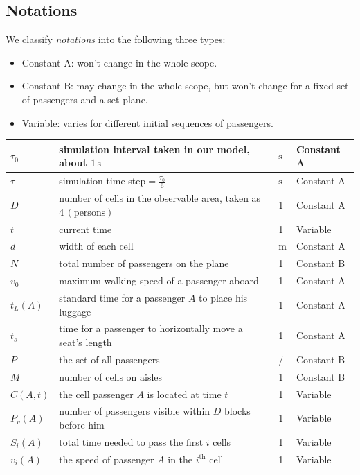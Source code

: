 \documentclass{article}
\newcommand{\cA}{\color{allanblue}Constant A\color{black}}
\newcommand{\cB}{\color{allandarkblue}Constant B\color{black}}
\newcommand{\varr}{\color{allanpurple}Variable\color{black}}
\theoremstyle{definition}
\theoremstyle{remark}
\numberwithin{equation}{section}
\begin{document}
	\subsection{Notations}
	We classify \textit{notations} into the following three types:
	\begin{itemize}
		\item \cA: won't change in the whole scope.
		\item \cB: may change in the whole scope, but won't change for a fixed set of passengers and a set plane.
		\item \varr: varies for different initial sequences of passengers.
	\end{itemize}
	\begin{center}
	\begin{tabular}{|l|l|l|l|}
		\hline
		$\tau_0$&simulation interval taken in our model, about \(1 \,\mathrm{s}\)&$\mathrm{s}$&\cA\\
		\hline
		\(\tau\)&simulation time step\(=\frac{\tau_0}{6}\)&\(\mathrm{s}\)&\cA\\
		\hline
		\(D\)&number of cells in the observable area, taken as \(4\,\left(\mathrm{persons}\right)\)&1&\cA\\
		\hline
		\(t\)&current time&1&\varr\\
		\hline
		$d$&width of each cell&$\mathrm{m}$&\cA\\
		\hline
		$N$&total number of passengers on the plane&1&\cB\\
		\hline
		$v_0$&maximum walking speed of a passenger aboard&1&\cA\\
		\hline
		$t_L (A)$&standard time for a passenger $A$ to place his luggage&1&\cA\\
		\hline
		$t_s$&time for a passenger to horizontally move a seat's length&1&\cA\\
		\hline
		$P$&the set of all passengers&/&\cB\\
		\hline
		$M$&number of cells on aisles&1&\cB\\
		\hline
		$C\left( A,t \right)$&the cell passenger $A$ is located at time $t$&1&\varr\\
		\hline
		$P_v\left( A \right)$&number of passengers visible within $D$ blocks before him&1&\varr\\
		\hline
		$S_i\left( A \right)$&total time needed to pass the first $i$ cells& 1&\varr\\
		\hline
		$v_i\left( A \right)$&the speed of passenger $A$ in the \(i^{\mathrm{th}}\) cell&1&\varr\\
		\hline

\end{tabular}
\end{center}
\end{document}
